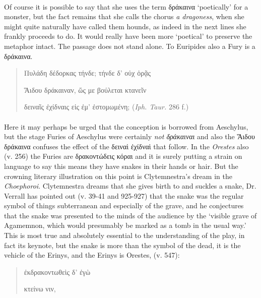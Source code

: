 \documentclass[a4paper, 11pt, oneside, polutonikogreek, english]{article}
\begin{document}
\paragraph{}
Of course it is possible to say that she uses the term δράκαινα `poetically' for a monster, but the fact remains that she calls the chorus \emph{a dragoness}, when she might quite naturally have called them hounds, as indeed in the next lines she frankly proceeds to do. It would really have been more `poetical' to preserve the metaphor intact. The passage does not stand alone. To Euripides also a Fury is a δράκαινα.
\begin{quotation}
Πυλάδη δέδορκας τήνδε; τήνδε δ' οὐχ ὁρᾷς

Ἅιδου δράκαιναν, ὥς με βούλεται κτανεῖν

δειναῖς ἐχίδναις εἰς ἐμ' ἐστομωμένη; (\emph{Iph. Taur.} 286 f.)
\end{quotation}
\paragraph{}
Here it may perhaps be urged that the conception is borrowed from Aeschylus, but the stage Furies of Aeschylus were certainly \emph{not δράκαιναι} and also the Ἅιδου δράκαινα confuses the effect of the δειναὶ ἐχίδναὶ that follow. In the \emph{Orestes} also (v. 256) the Furies are δρακοντώδεις κόραι and it is surely putting a strain on language to say this means they have snakes in their hands or hair. But the crowning literary illustration on this point is Clytemnestra's dream in the \emph{Choephoroi}. Clytemnestra dreams that she gives birth to and suckles a snake, Dr. Verrall has pointed out (v. 39-41 and 925-927) that the snake was the regular symbol of things subterranean and especially of the grave, and he conjectures that the snake was presented to the minds of the audience by the `visible grave of Agamemnon, which would presumably be marked as a tomb in the usual way.' This is most true and absolutely essential to the understanding of the play, in fact its keynote, but the snake is more than the symbol of the dead, it is the vehicle of the Erinys, and the Erinys is Orestes, (v. 547):
\begin{quotation}
\hspace*{20mm}ἐκδρακοντωθεὶς δ' ἐγὼ

κτείνω νιν,
\end{quotation}
\end{document}
